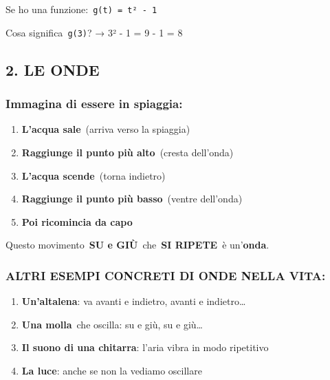 \documentclass[
]{article}
\providecommand{\tightlist}{%
  \setlength{\itemsep}{0pt}\setlength{\parskip}{0pt}}
\begin{document}
Se ho una funzione:~\texttt{g(t)\ =\ t²\ -\ 1}

Cosa significa~\texttt{g(3)}? → 3² - 1 = 9 - 1 = 8

\hypertarget{le-onde}{%
\subsection{2. LE ONDE}\label{le-onde}}

\hypertarget{immagina-di-essere-in-spiaggia}{%
\subsubsection{\texorpdfstring{\textbf{Immagina di essere in spiaggia:}}{Immagina di essere in spiaggia:}}\label{immagina-di-essere-in-spiaggia}}

\begin{enumerate}
\def\labelenumi{\arabic{enumi}.}
\tightlist
\item
  \textbf{L'acqua sale}~(arriva verso la spiaggia)
\item
  \textbf{Raggiunge il punto più alto}~(cresta dell'onda)
\item
  \textbf{L'acqua scende}~(torna indietro)
\item
  \textbf{Raggiunge il punto più basso}~(ventre dell'onda)
\item
  \textbf{Poi ricomincia da capo}
\end{enumerate}

Questo movimento~\textbf{SU e GIÙ}~che~\textbf{SI RIPETE}~è un'\textbf{onda}.

\hypertarget{altri-esempi-concreti-di-onde-nella-vita}{%
\subsubsection{\texorpdfstring{\textbf{ALTRI ESEMPI CONCRETI DI ONDE NELLA VITA:}}{ALTRI ESEMPI CONCRETI DI ONDE NELLA VITA:}}\label{altri-esempi-concreti-di-onde-nella-vita}}

\begin{enumerate}
\def\labelenumi{\arabic{enumi}.}
\tightlist
\item
  \textbf{Un'altalena}: va avanti e indietro, avanti e indietro\ldots{}
\item
  \textbf{Una molla}~che oscilla: su e giù, su e giù\ldots{}
\item
  \textbf{Il suono di una chitarra}: l'aria vibra in modo ripetitivo
\item
  \textbf{La luce}: anche se non la vediamo oscillare
\end{enumerate}
\end{document}
